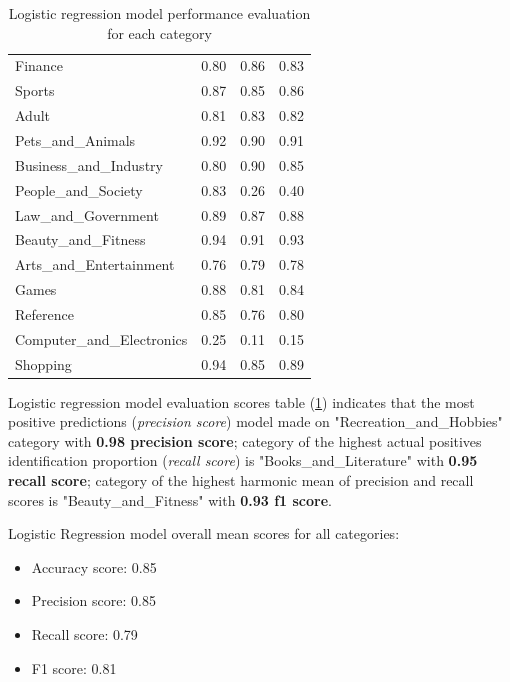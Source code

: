 \begin{enumerate}
\begin{table}[H]
\begin{tabular}{l|c|c|c|}
            Finance & 0.80 & 0.86 & 0.83 \\ \cline{2-4} 
            Sports &  0.87 & 0.85 & 0.86 \\ \cline{2-4} 
            Adult & 0.81 & 0.83 & 0.82 \\ \cline{2-4} 
            Pets\_and\_Animals & 0.92 & 0.90 & 0.91 \\ \cline{2-4} 
            Business\_and\_Industry & 0.80 & 0.90 & 0.85 \\ \cline{2-4} 
            People\_and\_Society & 0.83 & 0.26 & 0.40 \\ \cline{2-4} 
            Law\_and\_Government & 0.89 & 0.87 & 0.88 \\ \cline{2-4} 
            Beauty\_and\_Fitness & 0.94 & 0.91 & 0.93 \\ \cline{2-4} 
            Arts\_and\_Entertainment & 0.76 & 0.79 & 0.78 \\ \cline{2-4} 
            Games & 0.88 & 0.81 & 0.84 \\ \cline{2-4} 
            Reference & 0.85 & 0.76 & 0.80 \\ \cline{2-4} 
            Computer\_and\_Electronics & 0.25 & 0.11 & 0.15 \\ \cline{2-4} 
            Shopping &  0.94 & 0.85 & 0.89 \\ \cline{2-4} 
        \end{tabular}
        \caption{Logistic regression model performance evaluation for each category}
        \label{table: lr_table}
    \end{table}
    
    Logistic regression model evaluation scores table (\ref{table: lr_table}) indicates that the most positive predictions (\textit{precision score}) model made on "Recreation\_and\_Hobbies" category with \textbf{0.98 precision score}; category of the highest actual positives identification proportion (\textit{recall score}) is "Books\_and\_Literature" with  \textbf{0.95 recall score}; category of the highest harmonic mean of precision and recall scores is "Beauty\_and\_Fitness" with  \textbf{0.93 f1 score}.
    
    Logistic Regression model overall mean scores for all categories:
    \label{sssec:lr_overall}
    \begin{itemize}
        \item Accuracy score:  0.85
        \item Precision score: 0.85
        \item Recall score: 0.79
        \item F1 score: 0.81
    \end{itemize}
    

\end{enumerate}
